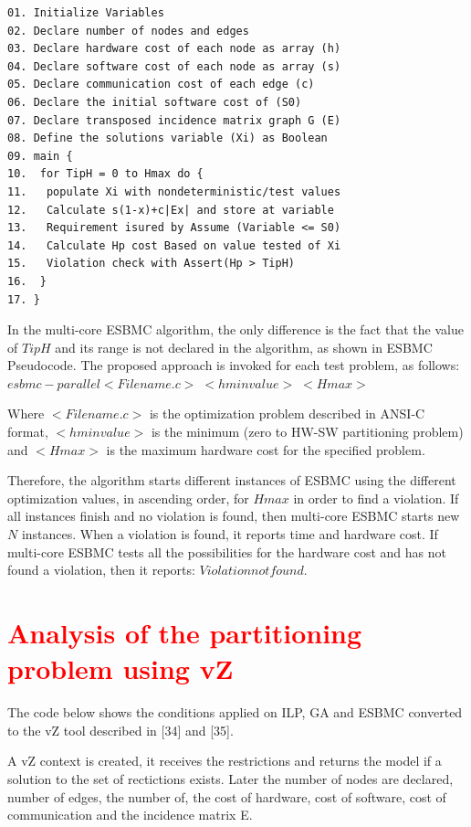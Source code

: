 \begin{lstlisting}
01. Initialize Variables 
02. Declare number of nodes and edges
03. Declare hardware cost of each node as array (h)
04. Declare software cost of each node as array (s)
05. Declare communication cost of each edge (c)
06. Declare the initial software cost of (S0)
07. Declare transposed incidence matrix graph G (E)
08. Define the solutions variable (Xi) as Boolean
09. main {
10.  for TipH = 0 to Hmax do {
11.   populate Xi with nondeterministic/test values
12.   Calculate s(1-x)+c|Ex| and store at variable
13.   Requirement isured by Assume (Variable <= S0)
14.   Calculate Hp cost Based on value tested of Xi
15.   Violation check with Assert(Hp > TipH)
16.  }
17. }
\end{lstlisting}

In the multi-core ESBMC algorithm, the only difference is the fact that the value of $ TipH $ and its range is not declared in the algorithm, as shown in ESBMC Pseudocode. The proposed approach is invoked for each test problem, as follows:
$ esbmc-parallel <Filename.c> \; <hminvalue> \; <Hmax> $

Where $ <Filename.c> $ is the optimization problem described in ANSI-C format, $  <hminvalue> $ is the minimum (zero to HW-SW partitioning problem) and $ <Hmax> $ is the maximum hardware cost for the specified problem.

Therefore, the algorithm starts  different instances of ESBMC using the different optimization values, in ascending order, for $ Hmax $ in order to find a violation. If all instances finish and no violation is found, then multi-core ESBMC starts new $ N $ instances. When a violation is found, it reports time and hardware cost. If multi-core ESBMC tests all the possibilities for the hardware cost and has not found a violation, then it reports: $ Violation not found $.

\section{\textcolor{Red}{Analysis of the partitioning problem using vZ}}

The code below shows the conditions applied on ILP, GA and ESBMC converted to the vZ tool described in [34] and [35]. 

A vZ context is created, it receives the restrictions and returns the model if a solution to the set of rectictions exists. Later the number of nodes are declared, number of edges, the number of, the cost of hardware, cost of software, cost of communication and the incidence matrix E.

